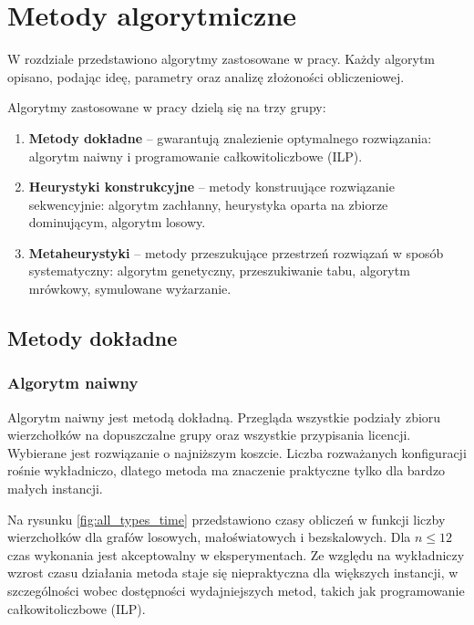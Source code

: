\chapter{Metody algorytmiczne}\label{chap:algorithms}

W rozdziale przedstawiono algorytmy zastosowane w pracy. Każdy algorytm opisano, podając ideę, parametry oraz analizę złożoności obliczeniowej.


Algorytmy zastosowane w pracy dzielą się na trzy grupy:
\begin{enumerate}
  \item \textbf{Metody dokładne} -- gwarantują znalezienie optymalnego rozwiązania: algorytm naiwny i programowanie całkowitoliczbowe (ILP).
  \item \textbf{Heurystyki konstrukcyjne} -- metody konstruujące rozwiązanie sekwencyjnie: algorytm zachłanny, heurystyka oparta na zbiorze dominującym, algorytm losowy.
  \item \textbf{Metaheurystyki} -- metody przeszukujące przestrzeń rozwiązań w sposób systematyczny: algorytm genetyczny, przeszukiwanie tabu, algorytm mrówkowy, symulowane wyżarzanie.
\end{enumerate}

\section{Metody dokładne}

\subsection{Algorytm naiwny}\label{subsec:naive}
Algorytm naiwny jest metodą dokładną. Przegląda wszystkie podziały zbioru wierzchołków na dopuszczalne grupy oraz wszystkie przypisania licencji. Wybierane jest rozwiązanie o najniższym koszcie. Liczba rozważanych konfiguracji rośnie wykładniczo, dlatego metoda ma znaczenie praktyczne tylko dla bardzo małych instancji.

Na rysunku \ref{fig:all_types_time} przedstawiono czasy obliczeń w funkcji liczby wierzchołków dla grafów losowych, małoświatowych i bezskalowych. Dla $n\le 12$ czas wykonania jest akceptowalny w eksperymentach. Ze względu na wykładniczy wzrost czasu działania metoda staje się niepraktyczna dla większych instancji, w szczególności wobec dostępności wydajniejszych metod, takich jak programowanie całkowitoliczbowe (ILP).

